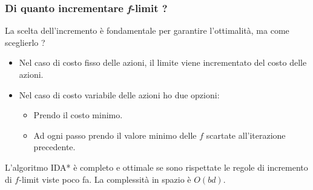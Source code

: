 \subsubsection{Di quanto incrementare \emph{f}-limit ?}
La scelta dell'incremento \`e fondamentale per garantire l'ottimalit\`a, ma come
sceglierlo ?
\begin{itemize}
	\item Nel caso di costo fisso delle azioni, il limite viene incrementato del costo
	      delle azioni.
	\item Nel caso di costo variabile delle azioni ho due opzioni:
	      \begin{itemize}
		      \item Prendo il costo minimo.
		      \item Ad ogni passo prendo il valore minimo delle $f$ scartate
		            all'iterazione precedente.
	      \end{itemize}
\end{itemize}
L'algoritmo IDA* \`e completo e ottimale se sono rispettate le regole di incremento di $f$-limit
viste poco fa. La complessit\`a in spazio \`e $O(bd)$.